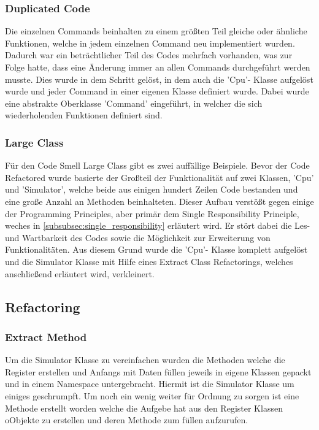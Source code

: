 \documentclass[12pt,a4paper,titlepage,ngerman,pdftex]{report}
\begin{document}
    \subsubsection{Duplicated Code}\label{subsubsec:duplicated_code}

    Die einzelnen Commands beinhalten zu einem größten Teil gleiche oder ähnliche Funktionen, welche in jedem einzelnen Command neu implementiert wurden. Dadurch war ein beträchtlicher Teil des Codes mehrfach vorhanden, was zur Folge hatte,
    dass eine Änderung immer an allen Commands durchgeführt werden musste. Dies wurde in dem Schritt gelöst, in dem auch die 'Cpu'- Klasse aufgelöst wurde und jeder Command in einer eigenen Klasse definiert wurde. 
    Dabei wurde eine abstrakte Oberklasse 'Command' eingeführt, in welcher die sich wiederholenden Funktionen definiert sind.

    \subsubsection{Large Class}
    Für den Code Smell Large Class gibt es zwei auffällige Beispiele. Bevor der Code Refactored wurde basierte der Großteil der Funktionalität auf zwei Klassen, 'Cpu' und 'Simulator', welche beide aus einigen hundert Zeilen Code bestanden und eine große Anzahl an Methoden beinhalteten.
    Dieser Aufbau verstößt gegen einige der Programming Principles, aber primär dem Single Responsibility Principle, weches in \autoref{subsubsec:single_responsibility} erläutert wird. Er stört dabei die Les- und Wartbarkeit des Codes sowie die Möglichkeit zur Erweiterung von Funktionalitäten.
    Aus diesem Grund wurde die 'Cpu'- Klasse komplett aufgelöst und die  Simulator Klasse mit Hilfe eines Extract Class Refactorings, welches anschließend erläutert wird, verkleinert.

    \subsection{Refactoring}
    \subsubsection{Extract Method}
	Um die Simulator Klasse zu vereinfachen wurden die Methoden welche die Register erstellen und Anfangs mit Daten füllen jeweils in eigene Klassen gepackt und in einem Namespace untergebracht.
	Hiermit ist die Simulator Klasse um einiges geschrumpft.
	Um noch ein wenig weiter für Ordnung zu sorgen ist eine Methode erstellt worden welche die Aufgebe hat aus den Register Klassen oObjekte zu erstellen und deren Methode zum füllen aufzurufen. 
	
\end{document}
